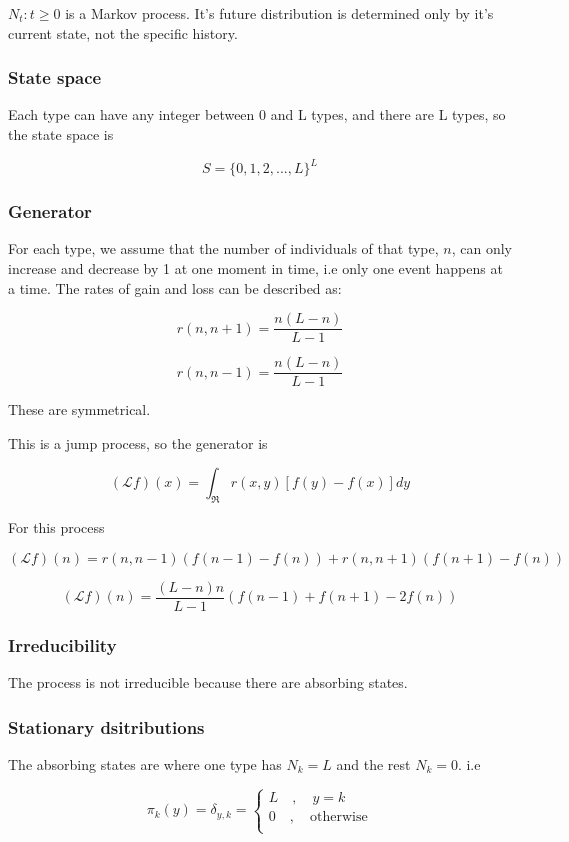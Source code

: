 \documentclass{article}
\begin{document}
$N_t : t \geq 0$ is a Markov process. It's future distribution is determined only by it's current state, not the specific history.

\subsubsection{State space}

Each type can have any integer between 0 and L types, and there are L types, so the state space is 

$$S = \{0,1,2,...,L\}^L$$

\subsubsection{Generator}

For each type, we assume that the number of individuals of that type, $n$, can only increase and decrease by 1 at one moment in time, i.e only one event happens at a time. The rates of gain and loss can be described as:

$$r(n,n+1) = \frac{n(L-n)}{L-1}$$

$$r(n,n-1) = \frac{n(L-n)}{L-1}$$

These are symmetrical. 


This is a jump process, so the generator is

$$(\mathcal{L}f)(x) = \int_{\Re} r(x,y)[f(y)-f(x)]dy$$

For this process

$$(\mathcal{L}f)(n) = r(n,n-1)(f(n-1)-f(n)) + r(n,n+1)(f(n+1)-f(n))$$

$$(\mathcal{L}f)(n) = \frac{(L-n)n}{L-1}(f(n-1) + f(n+1) - 2f(n))$$




\subsubsection{Irreducibility}

The process is not irreducible because there are absorbing states. 

\subsubsection{Stationary dsitributions}

The absorbing states are where one type has $N_k = L$ and the rest $N_k=0$. i.e

$$ \pi_k(y) = \delta_{y,k} = \begin{cases}
L \quad , \quad y=k\\
0 \quad , \quad \text{otherwise}\\
\end{cases}$$
\end{document}
